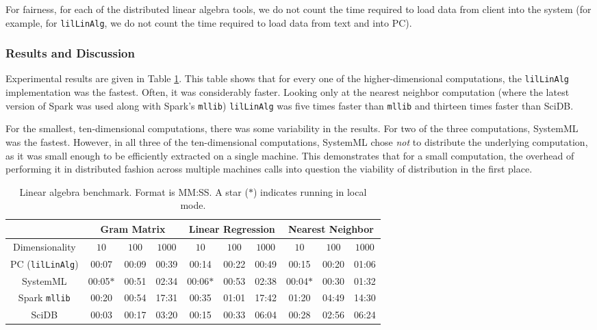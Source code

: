 For fairness, for each of the distributed linear algebra tools, 
we do not count the time required to load data from client into the system
(for example, 
for \texttt{lilLinAlg}, we do not count the time required to load data from text and into PC).

\subsubsection {Results and Discussion}

Experimental results are given in 
Table \ref{fig:LR}. 
This table shows that for every one of the higher-dimensional computations, the 
\texttt{lilLinAlg} implementation was the fastest.  Often, it was considerably faster.
Looking only at the nearest neighbor computation (where the latest version of Spark was used
along with Spark's \texttt{mllib}) \texttt{lilLinAlg} was five times faster than \texttt{mllib}
and thirteen times faster than SciDB.  

For the smallest, ten-dimensional computations, there was some variability in the results.
For two of the three computations, 
SystemML was the fastest.  However, in all three of the ten-dimensional computations, SystemML chose
\emph{not} to distribute the underlying computation, as it was small enough to be efficiently extracted
on a single machine.  This demonstrates that for a small computation, the overhead of performing it in 
distributed fashion across multiple machines calls into question the viability of distribution in the first place.

\begin{table}[h!]
\begin{center}
\begin{tabular}{|c||c|c|c||c|c|c||c|c|c||}
\hline
& \multicolumn{3}{c||}{Gram Matrix} & \multicolumn{3}{c||}{Linear Regression} & \multicolumn{3}{c||}{Nearest Neighbor} \\
\hline
Dimensionality & $10$ & $100$ & $1000$& $10$ & $100$ & $1000$& $10$ & $100$ & $1000$ \\
\hline
\hline
PC (\texttt{lilLinAlg}) &00:07 & 00:09 &00:39 &00:14 &00:22 &00:49& 00:15 & 00:20 & 01:06 \\
SystemML &00:05$*$ &00:51 &02:34 &00:06$*$ &00:53 &02:38 &00:04$*$ &00:30 &01:32 \\
Spark \texttt{mllib} &00:20  &00:54 &17:31 &00:35 &01:01 &17:42 &01:20 & 04:49 &14:30 \\
SciDB   &00:03 &00:17 &03:20 &00:15 &00:33 &06:04 &00:28 &02:56 & 06:24 \\
\hline
\end{tabular}
\caption{Linear algebra benchmark. Format is MM:SS.
A star ($*$) indicates running in local mode.}
\label{fig:LR}
\end{center}
\end{table}

